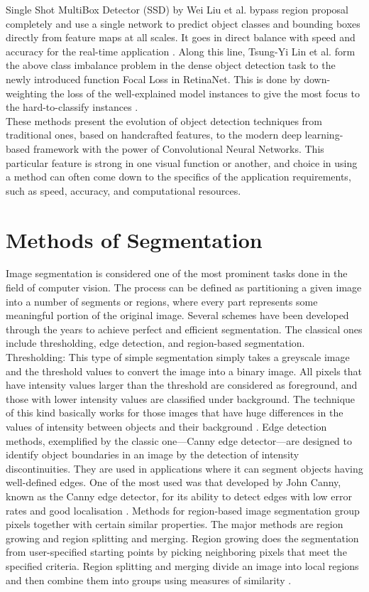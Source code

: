     Single Shot MultiBox Detector (SSD) by Wei Liu et al. bypass region proposal completely and use a single network to predict object classes and bounding boxes directly from feature maps at all scales. It goes in direct balance with speed and accuracy for the real-time application \citep{liu2016ssd}. Along this line, Tsung-Yi Lin et al. form the above class imbalance problem in the dense object detection task to the newly introduced function Focal Loss in RetinaNet. This is done by down-weighting the loss of the well-explained model instances to give the most focus to the hard-to-classify instances \citep{lin2017focal}.\\
    
    These methods present the evolution of object detection techniques from traditional ones, based on handcrafted features, to the modern deep learning-based framework with the power of Convolutional Neural Networks. This particular feature is strong in one visual function or another, and choice in using a method can often come down to the specifics of the application requirements, such as speed, accuracy, and computational resources.

\section{Methods of Segmentation}
    Image segmentation is considered one of the most prominent tasks done in the field of computer vision. The process can be defined as partitioning a given image into a number of segments or regions, where every part represents some meaningful portion of the original image. Several schemes have been developed through the years to achieve perfect and efficient segmentation. The classical ones include thresholding, edge detection, and region-based segmentation. Thresholding: This type of simple segmentation simply takes a greyscale image and the threshold values to convert the image into a binary image. All pixels that have intensity values larger than the threshold are considered as foreground, and those with lower intensity values are classified under background. The technique of this kind basically works for those images that have huge differences in the values of intensity between objects and their background \citep{otsu1975threshold}. Edge detection methods, exemplified by the classic one—Canny edge detector—are designed to identify object boundaries in an image by the detection of intensity discontinuities. They are used in applications where it can segment objects having well-defined edges. One of the most used was that developed by John Canny, known as the Canny edge detector, for its ability to detect edges with low error rates and good localisation \citep{canny1986computational}. Methods for region-based image segmentation group pixels together with certain similar properties. The major methods are region growing and region splitting and merging. Region growing does the segmentation from user-specified starting points by picking neighboring pixels that meet the specified criteria. Region splitting and merging divide an image into local regions and then combine them into groups using measures of similarity \citep{adams1994seeded}.\\

